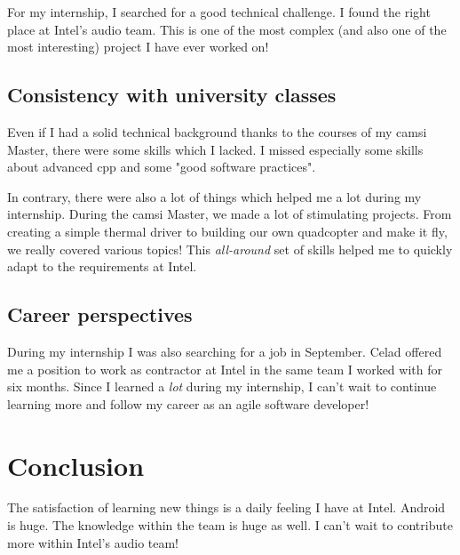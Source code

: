 For my internship, I searched for a good technical challenge. I found the right place
at Intel's audio team.
This is one of the most complex (and also one of the most
interesting) project I have ever worked on!

\subsection{Consistency with university classes}
Even if I had a solid technical background thanks to the courses of my
\gls{camsi} Master, there were some skills which I lacked.
I missed especially some skills about advanced \gls{cpp} and some "good software practices".

In contrary, there were also a lot of things which helped me a lot during
my internship.  During the \gls{camsi} Master, we made a lot of stimulating
projects. From creating a simple thermal driver to building our own quadcopter
and make it fly, we really covered various topics! This \emph{all-around} set of
skills helped me to quickly adapt to the requirements at Intel.

\subsection{Career perspectives}
During my internship I was also searching for a job in September. Celad offered me a position to work
as contractor at Intel in the same team I worked with for six months.
Since I learned a \emph{lot} during my internship, I can't wait to continue learning more and follow my career
as an agile software developer!

\section{Conclusion}
The satisfaction of learning new things is a daily feeling I have at
Intel. Android is huge. The knowledge within the team is huge as well. I can't
wait to contribute more within Intel's audio team!
